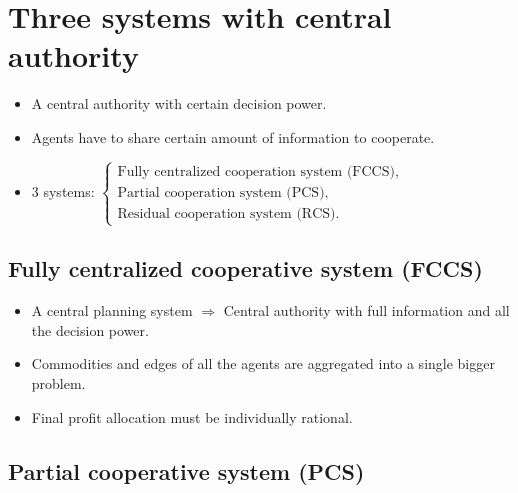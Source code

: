 \documentclass[aspectratio=169]{beamer}
\begin{document}
\section{Three systems with central authority}
\begin{frame}{\secname}
\begin{itemize}
\setlength\itemsep{1em}

\item A central authority with certain decision power.
\item Agents have to share certain amount of information to cooperate.
\item 3 systems: $\begin{cases}
\text{Fully centralized cooperation system (FCCS),}\\
\text{Partial cooperation system (PCS),} \\
\text{Residual cooperation system (RCS).}
\end{cases}$
\end{itemize}
\end{frame}

\subsection*{Fully centralized cooperative system (FCCS)} 
\begin{frame}{\subsecname}
\begin{itemize}
\setlength\itemsep{1em}
\item A central planning system $\Longrightarrow$ Central authority with \alert{full information} and \alert{all the decision power.}
\item Commodities and edges of all the agents are aggregated into a single bigger problem.
\item Final profit allocation must be \alert{individually rational}.
\end{itemize}
\end{frame}

\subsection*{Partial cooperative system (PCS)}

\end{document}
